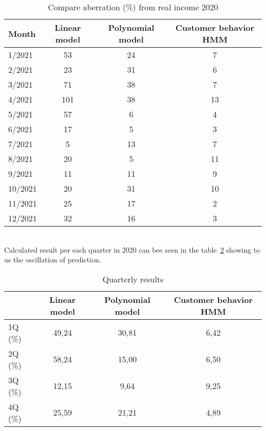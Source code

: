 \begin{table}[h!]
    \begin{center}
        \begin{tabular}{ | l | c | c | c |}
            \hline
            {\textbf{Month}} & \textbf{Linear model} & \textbf{Polynomial model} & \textbf{Customer behavior HMM}\\
            \hline
            1/2021 & 53 & 24 &  7\\
            2/2021 & 23 & 31 & 6\\
            3/2021 & 71 & 38 & 7\\
            4/2021 & 101 & 38 & 13\\
            5/2021 & 57 & 6 & 4\\
            6/2021 & 17 & 5 & 3\\
            7/2021 & 5 & 13 & 7\\
            8/2021 & 20 & 5 & 11\\
            9/2021 & 11 & 11 & 9\\
            10/2021 & 20 & 31 & 10\\
            11/2021 & 25 & 17 & 2\\
            12/2021 & 32 & 16 & 3\\
            \hline
        \end{tabular}
    \end{center}
    \caption{Compare aberration (\%) from real income 2020}
    \label{Compare results}
\end{table}\\
Calculated result per each quarter in 2020 can bee seen in the table~\ref{qResults} showing to us the oscillation of prediction.
\begin{table}[h!]
    \begin{center}
        \begin{tabular}{ | l | c | c | c |}
            \hline
            & \textbf{Linear model} & \textbf{Polynomial model} & \textbf{Customer behavior HMM}\\
            \hline
            1Q (\%) & 49,24 & 30,81 & 6,42\\
            2Q (\%) & 58,24 & 15,00 & 6,50\\
            3Q (\%) & 12,15 & 9,64 & 9,25\\
            4Q (\%) & 25,59 & 21,21 & 4,89\\
            \hline
        \end{tabular}
    \end{center}
    \caption{Quarterly results}
    \label{qResults}
\end{table}\\
